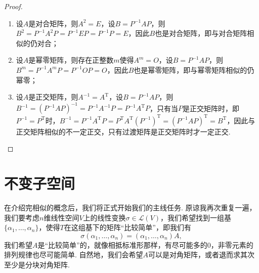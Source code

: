 \begin{enumerate}
\begin{proof}
\begin{enumerate}
                  \item 设$A$是对合矩阵，则$A^2=E$，设$B=P^{-1}AP$，则$B^2=P^{-1}A^2P=P^{-1}EP=P^{-1}P=E$，因此$B$也是对合矩阵，即与对合矩阵相似的仍对合；

                  \item 设$A$是幂零矩阵，则存在正整数$m$使得$A^m=O$，设$B=P^{-1}AP$，则$B^m=P^{-1}A^mP=P^{-1}OP=O$，因此$B$也是幂零矩阵，即与幂零矩阵相似的仍幂零；

                  \item 设$A$是正交矩阵，则$A^{-1}=A^\mathrm{T}$，设$B=P^{-1}AP$，则$B^{-1}=(P^{-1}AP)^{-1}=P^{-1}A^{-1}P=P^{-1}A^\mathrm{T}P$，只有当$P$是正交矩阵时，即$P^{-1}=P^\mathrm{T}$时，$B^{-1}=P^{-1}A^\mathrm{T}P=P^\mathrm{T}A^\mathrm{T}(P^{-1})^\mathrm{T}=(P^{-1}AP)^\mathrm{T}=B^\mathrm{T}$，因此与正交矩阵相似的不一定正交，只有过渡矩阵是正交矩阵时才一定正交.
              \end{enumerate}
          \end{proof}
\end{enumerate}

\section{不变子空间}

在介绍完相似的概念后，我们将正式开始我们的主线任务. 原谅我再次重复一遍，我们要考虑$n$维线性空间$V$上的线性变换$\sigma\in\mathcal{L}(V)$，我们希望找到一组基$\{\alpha_1,\ldots,\alpha_n\}$，使得$T$在这组基下的矩阵``比较简单''，即我们有
\[\sigma(\alpha_1,\ldots,\alpha_n)=(\alpha_1,\ldots,\alpha_n)A,\]
我们希望$A$是``比较简单''的，就像相抵标准形那样，有尽可能多的$0$，非零元素的排列规律也尽可能简单. 自然地，我们会希望$A$可以是对角矩阵，或者退而求其次至少是分块对角矩阵.

